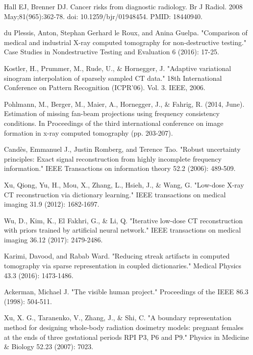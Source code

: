 \begin{thebibliography}{00}

Hall EJ, Brenner DJ. Cancer risks from diagnostic radiology. Br J Radiol. 2008 May;81(965):362-78. doi: 10.1259/bjr/01948454. PMID: 18440940.

du Plessis, Anton, Stephan Gerhard le Roux, and Anina Guelpa. "Comparison of medical and industrial X-ray computed tomography for non-destructive testing." Case Studies in Nondestructive Testing and Evaluation 6 (2016): 17-25.

Kostler, H., Prummer, M., Rude, U., \& Hornegger, J. "Adaptive variational sinogram interpolation of sparsely sampled CT data." 18th International Conference on Pattern Recognition (ICPR'06). Vol. 3. IEEE, 2006.

Pohlmann, M., Berger, M., Maier, A., Hornegger, J., \& Fahrig, R. (2014, June). Estimation of missing fan-beam projections using frequency consistency conditions. In Proceedings of the third international conference on image formation in x-ray computed tomography (pp. 203-207).

Candès, Emmanuel J., Justin Romberg, and Terence Tao. "Robust uncertainty principles: Exact signal reconstruction from highly incomplete frequency information." IEEE Transactions on information theory 52.2 (2006): 489-509.

Xu, Qiong, Yu, H., Mou, X., Zhang, L., Hsieh, J., \& Wang, G. "Low-dose X-ray CT reconstruction via dictionary learning." IEEE transactions on medical imaging 31.9 (2012): 1682-1697.

Wu, D., Kim, K., El Fakhri, G., \& Li, Q. "Iterative low-dose CT reconstruction with priors trained by artificial neural network." IEEE transactions on medical imaging 36.12 (2017): 2479-2486.

Karimi, Davood, and Rabab Ward. "Reducing streak artifacts in computed tomography via sparse representation in coupled dictionaries." Medical Physics 43.3 (2016): 1473-1486.

Ackerman, Michael J. "The visible human project." Proceedings of the IEEE 86.3 (1998): 504-511.

Xu, X. G., Taranenko, V., Zhang, J., \& Shi, C. "A boundary representation method for designing whole-body radiation dosimetry models: pregnant females at the ends of three gestational periods RPI P3, P6 and P9." Physics in Medicine \& Biology 52.23 (2007): 7023.


\end{thebibliography}
